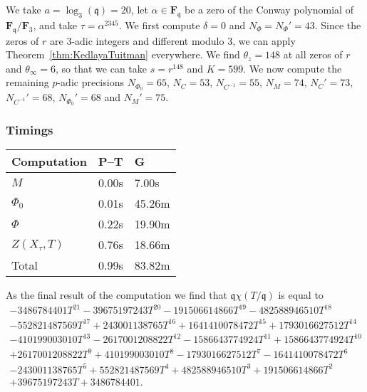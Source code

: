 \documentclass[a4paper,11pt]{article}
\numberwithin{equation}{section}
\newcommand{\FF}{\mathbf{F}} %
\theoremstyle{definition}
\begin{document}
We take $a=\log_3(\mathfrak{q})=20$, let $\alpha \in \FF_{\mathfrak{q}}$
be a zero of the Conway polynomial of $\FF_{\mathfrak{q}}/\FF_{3}$, and take
$\tau=\alpha^{2345}$.  We first compute $\delta=0$ and $N_{\Phi}=N_{\Phi}'=43$.  
Since the zeros of $r$ are $3$-adic integers and different modulo $3$, we can apply 
Theorem~\ref{thm:KedlayaTuitman} everywhere. We find $\theta_z=148$ at all zeros 
of $r$ and $\theta_{\infty}=6$, so that we can take $s=r^{148}$
and $K=599$. We now compute the remaining $p$-adic 
precisions $N_{\Phi_0}=65$, $N_C=53$, $N_{C^{-1}}=55$, $N_M=74$, 
$N_C'=73$, $N_{C^{-1}}'=68$, $N_{\Phi_0}'=68$ and $N_M'=75$.

\subsubsection{Timings}

\begin{center}
\begin{tabular}{l l l} \toprule
Computation     & P--T & G      \\ \midrule
$M$             & 0.00s& 7.00s      \\
$\Phi_0$        & 0.01s& 45.26m \\
$\Phi$          & 0.22s& 19.90m \\
$Z(X_{\tau},T)$ & 0.76s& 18.66m \\
Total           & 0.99s& 83.82m \\ \bottomrule
\end{tabular}
\end{center}

\bigskip

As the final result of the computation we find that 
$\mathfrak{q} \chi(T/\mathfrak{q})$ is equal to 
\begin{multline*}
- 3486784401T^{21} - 39675197243T^{20} - 191506614866T^{19} - 482588946510T^{18} \\
- 552821487569T^{17} + 243001138765T^{16} + 1641410078472T^{15} + 1793016627512T^{14} \\
- 410199003010T^{13} - 2617001208822T^{12} - 1586643774924T^{11} + 1586643774924T^{10} \\
+ 2617001208822T^9 + 410199003010T^8 - 1793016627512T^7 - 1641410078472T^6 \\
- 243001138765T^5+ 552821487569T^4 + 482588946510T^3 + 191506614866T^2 \\
+ 39675197243T + 3486784401.
\end{multline*}
\end{document}
